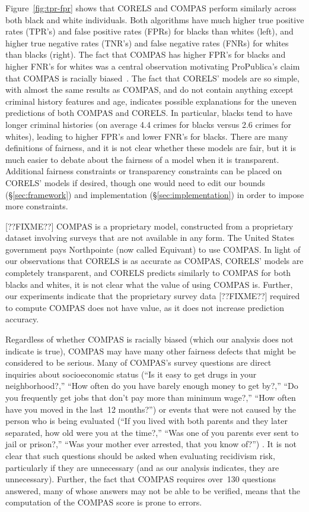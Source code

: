 Figure~\ref{fig:tpr-fpr} shows that CORELS and COMPAS perform similarly across both black and white individuals.
%
Both algorithms have much higher true positive rates (TPR's) and false positive rates (FPRs) for blacks than whites (left), and higher true negative rates (TNR's) and false negative rates (FNRs) for whites than blacks (right).
%
The fact that COMPAS has higher FPR's for blacks and higher FNR's for whites was a central observation motivating ProPublica's claim that COMPAS is racially biased~\citep{LarsonMaKiAn16}.
%
The fact that CORELS' models are so simple, with almost the same results as COMPAS, and do not contain anything except criminal history features and age, indicates possible explanations for the uneven predictions of both COMPAS and CORELS.
%
In particular, blacks tend to have longer criminal histories (on average 4.4 crimes for blacks versus 2.6 crimes for whites), leading to higher FPR's and lower FNR's for blacks.
%
There are many definitions of fairness, and it is not clear whether these models are fair, but it is much easier to debate about the fairness of a model when it is transparent.
%
Additional fairness constraints or transparency constraints can be placed on CORELS' models if desired, though one would need to edit our bounds (\S\ref{sec:framework}) and implementation (\S\ref{sec:implementation}) in order to impose more constraints.

[??FIXME??] COMPAS is a proprietary model, constructed from a proprietary dataset involving surveys that are not available in any form.
%
The United States government pays Northpointe (now called Equivant) to use COMPAS.
%
In light of our observations that CORELS is as accurate as COMPAS, CORELS' models are completely transparent, and CORELS predicts similarly to COMPAS for both blacks and whites, it is not clear what the value of using COMPAS is.
%
Further, our experiments indicate that the proprietary survey data [??FIXME??] required to compute COMPAS does not have value, as it does not increase prediction accuracy.

Regardless of whether COMPAS is racially biased (which our analysis does not indicate is true),
COMPAS may have many other fairness defects that might be considered to be serious.
%
Many of COMPAS's survey questions are direct inquiries about socioeconomic status
(``Is it easy to get drugs in your neighborhood?,''
``How often do you have barely enough money to get by?,''
``Do you frequently get jobs that don't pay more than minimum wage?,''
``How often have you moved in the last~12 months?'')
or events that were not caused by the person who is being evaluated
(``If you lived with both parents and they later separated, how old were you at the time?,''
``Was one of you parents ever sent to jail or prison?,''
``Was your mother ever arrested, that you know of?'')
\citep{compas-survey:2016,AngwinLaMaKi16}.
%
It is not clear that such questions should be asked when evaluating recidivism risk,
particularly if they are unnecessary (and as our analysis indicates, they are unnecessary).
%
Further, the fact that COMPAS requires over~130 questions answered,
many of whose answers may not be able to be verified,
means that the computation of the COMPAS score is prone to errors.

